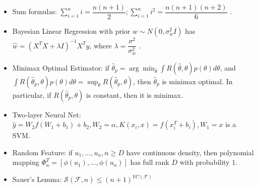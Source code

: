 \documentclass{article}
\begin{document}
\begin{itemize}
\item Sum formulas: $\displaystyle\sum_{i=1}^{n} i = \dfrac{n \left(n + 1\right)}{2} ; \displaystyle\sum_{i=1}^{n} i^{2} = \dfrac{n \left(n + 1\right)\left(n + 2\right)}{6}$ .
\item Bayesian Linear Regression with prior $w  \sim  N\left(0, \sigma_{w}^{2} I\right)$ has $\hat{w} = \left(X^{T} X + \lambda I\right)^{-1} X^{T} y $, where $\lambda = \dfrac{\sigma^{2}}{\sigma_{w}^{2}}$ .
\item Minimax Optimal Estimator: if $\hat{\theta}_{p} = \arg\displaystyle\min_{\hat{\theta}} \displaystyle\int R\left(\hat{\theta}, \theta\right) p\left(\theta\right) d \theta$, and $\displaystyle\int R\left(\hat{\theta}_{p}, \theta\right) p\left(\theta\right) d \theta = \displaystyle\sup_{\theta} R\left(\hat{\theta}_{p}, \theta\right)$, then $\hat{\theta}_{p}$ is minimax optimal. In particular, if $R\left(\hat{\theta}_{p}, \theta\right) $ is constant, then it is minimax.
\item Two-layer Neural Net: $\hat{y} = W_{2} f\left(W_{1} + b_{1}\right) + b_{2}, W_{2} = \alpha, K\left(x_{i}, x\right) = f\left(x_{i}^{T} + b_{i}\right), W_{1} = x $ is a SVM.
\item Random Feature: if $u_{1}, ..., u_{n}, n \geq  D $ have continuous density, then polynomial mapping $\Phi_{n}^{T} = \left[\phi\left(u_{1}\right), ..., \phi\left(u_{n}\right)\right]$ has full rank $D $ with probability $1$.
\item Sauer's Lemma: $\mathcal{S}\left(\mathcal{F}, n\right) \leq  \left(n + 1\right)^{VC \left(\mathcal{F}\right)}$
\end{itemize}
\end{document}
